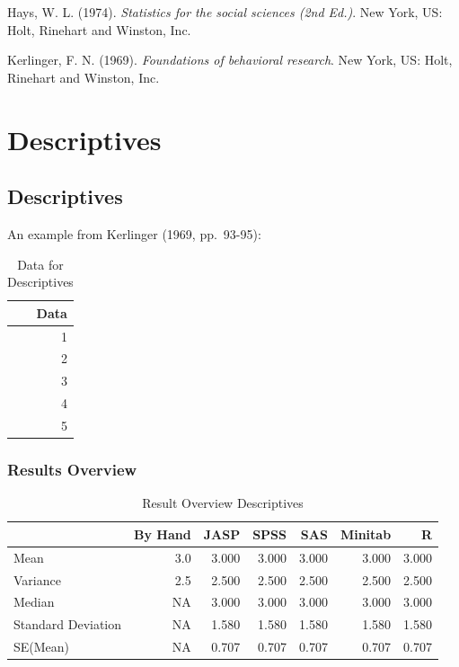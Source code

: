 \documentclass[
]{book}
\begin{document}
Hays, W. L. (1974). \emph{Statistics for the social sciences (2nd Ed.)}. New York, US: Holt, Rinehart and Winston, Inc.

Kerlinger, F. N. (1969). \emph{Foundations of behavioral research}. New York, US: Holt, Rinehart and Winston, Inc.

\hypertarget{descriptives}{%
\chapter{Descriptives}\label{descriptives}}

\hypertarget{descriptives-1}{%
\section{Descriptives}\label{descriptives-1}}

An example from Kerlinger (1969, pp.~93-95):

\begin{table}

\caption{\label{tab:unnamed-chunk-3}Data for Descriptives}
\centering
\begin{tabular}[t]{r}
\toprule
Data\\
\midrule
1\\
2\\
3\\
4\\
5\\
\bottomrule
\end{tabular}
\end{table}

\hypertarget{results-overview}{%
\subsection{Results Overview}\label{results-overview}}

\begin{table}

\caption{\label{tab:unnamed-chunk-4}Result Overview Descriptives}
\centering
\begin{tabular}[t]{lrrrrrr}
\toprule
  & By Hand & JASP & SPSS & SAS & Minitab & R\\
\midrule
Mean & 3.0 & 3.000 & 3.000 & 3.000 & 3.000 & 3.000\\
Variance & 2.5 & 2.500 & 2.500 & 2.500 & 2.500 & 2.500\\
Median & NA & 3.000 & 3.000 & 3.000 & 3.000 & 3.000\\
Standard Deviation & NA & 1.580 & 1.580 & 1.580 & 1.580 & 1.580\\
SE(Mean) & NA & 0.707 & 0.707 & 0.707 & 0.707 & 0.707\\
\bottomrule
\end{tabular}
\end{table}
\end{document}
